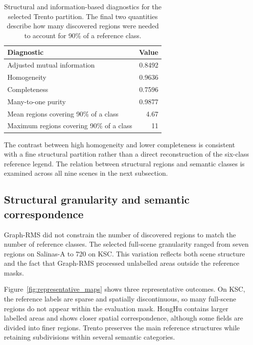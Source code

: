 \documentclass[10pt,a4paper,fleqn]{article}
\begin{document}
\begin{table}[!t]
\centering
\footnotesize
\caption{Structural and information-based diagnostics for the selected Trento
partition. The final two quantities describe how many discovered regions were
needed to account for 90\% of a reference class.}
\label{tab:trento_diagnostics}

\renewcommand{\arraystretch}{1.07}
\setlength{\tabcolsep}{7pt}

\begin{tabular}{@{}lr@{}}
\toprule
Diagnostic & Value \\
\midrule
Adjusted mutual information & 0.8492 \\
Homogeneity & 0.9636 \\
Completeness & 0.7596 \\
Many-to-one purity & 0.9877 \\
Mean regions covering 90\% of a class & 4.67 \\
Maximum regions covering 90\% of a class & 11 \\
\bottomrule
\end{tabular}
\end{table}

The contrast between high homogeneity and lower completeness is consistent
with a fine structural partition rather than a direct reconstruction of the
six-class reference legend. The relation between structural regions and
semantic classes is examined across all nine scenes in the next subsection.


\subsection{Structural granularity and semantic correspondence}
\label{subsec:fragmentation_results}

Graph-RMS did not constrain the number of discovered regions to match the
number of reference classes. The selected full-scene granularity ranged from
seven regions on Salinas-A to 720 on KSC. This variation reflects both scene
structure and the fact that Graph-RMS processed unlabelled areas outside the
reference masks.

Figure~\ref{fig:representative_maps} shows three representative outcomes. On
KSC, the reference labels are sparse and spatially discontinuous, so many
full-scene regions do not appear within the evaluation mask. HongHu contains
larger labelled areas and shows closer spatial correspondence, although some
fields are divided into finer regions. Trento preserves the main reference
structures while retaining subdivisions within several semantic categories.
\end{document}

